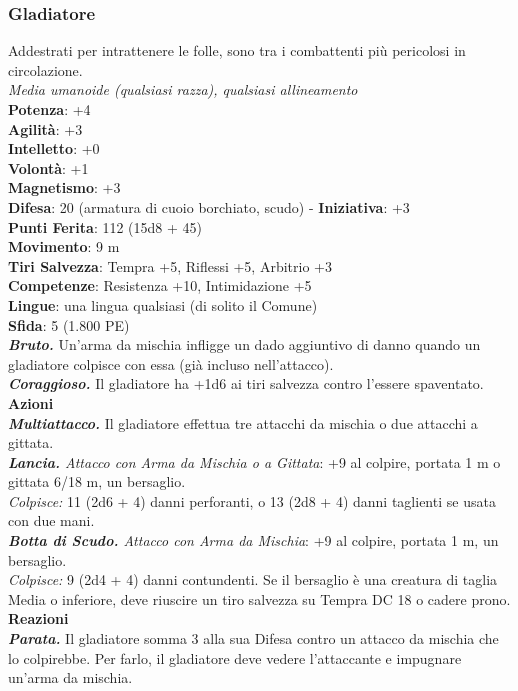 \begin{multicols}{2}
\subsubsection{Gladiatore}
Addestrati per intrattenere le folle, sono tra i combattenti più pericolosi in circolazione.\\
\emph{Media umanoide (qualsiasi razza), qualsiasi allineamento}\\
\textbf{Potenza}: +4\\
\textbf{Agilità}: +3\\
\textbf{Intelletto}: +0\\
\textbf{Volontà}: +1\\
\textbf{Magnetismo}: +3\\
\textbf{Difesa}: 20 (armatura di cuoio borchiato, scudo) - \textbf{Iniziativa}: +3\\
\textbf{Punti Ferita}: 112 (15d8 + 45)\\
\textbf{Movimento}: 9 m\\
\textbf{Tiri Salvezza}: Tempra +5, Riflessi +5, Arbitrio +3 \\
\textbf{Competenze}: Resistenza +10, Intimidazione +5\\
\textbf{Lingue}: una lingua qualsiasi (di solito il Comune)\\
\textbf{Sfida}: 5 (1.800 PE)\smallskip\\
\emph{\textbf{Bruto.}} Un'arma da mischia infligge un dado aggiuntivo di danno quando un gladiatore colpisce con essa (già incluso nell'attacco).\\
\emph{\textbf{Coraggioso.}} Il gladiatore ha +1d6 ai tiri salvezza contro l'essere spaventato.\\
\smallskip\textbf{Azioni}\\
\emph{\textbf{Multiattacco.}} Il gladiatore effettua tre attacchi da mischia o due attacchi a gittata.\\
\emph{\textbf{Lancia.} Attacco con Arma da Mischia o a Gittata}: +9 al colpire, portata 1 m o gittata 6/18 m, un bersaglio.\\
\emph{Colpisce:} 11 (2d6 + 4) danni perforanti, o 13 (2d8 + 4) danni taglienti se usata con due mani.\\
\emph{\textbf{Botta di Scudo.} Attacco con Arma da Mischia}: +9 al colpire, portata 1 m, un bersaglio.\\
\emph{Colpisce:} 9 (2d4 + 4) danni contundenti. Se il bersaglio è una creatura di taglia Media o inferiore, deve riuscire un tiro salvezza su Tempra DC  18 o cadere prono.\\
\textbf{Reazioni}\\
\emph{\textbf{Parata.}} Il gladiatore somma 3 alla sua Difesa contro un attacco da mischia che lo colpirebbe. Per farlo, il gladiatore deve vedere l'attaccante e impugnare un'arma da mischia.\\


\end{multicols}
